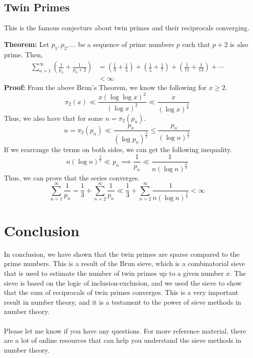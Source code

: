 \subsection{Twin Primes}
This is the famous conjecture about twin primes and their reciprocals converging.
\begin{boxedsection}
    \textbf{Theorem:} Let $p_1, p_2, \dots$ be a sequence of prime numbers $p$ such that $p+2$ is also prime. Then,
    \begin{align*}
        \sum_{n=1}^\infty \left(\frac{1}{p_n} + \frac{1}{p_n+2}\right) &= \left(\frac{1}{3} + \frac{1}{5}\right) + \left(\frac{1}{5} + \frac{1}{7}\right) + \left(\frac{1}{11} + \frac{1}{13}\right) + \cdots\\
        &< \infty
    \end{align*}
    \textbf{Proof:} From the above Brun's Theorem, we know the following for $x \geq 2$.
    $$
    \pi_2(x) \ll \frac{x (\log \log x)^2}{(\log x)^2} \ll \frac{x}{(\log x)^{\frac{3}{2}}}
    $$
    Thus, we also have that for some $n = \pi_2(p_n)$.
    $$
    n = \pi_2(p_n) \ll \frac{p_n}{(\log p_n)^{\frac{3}{2}}} \leq \frac{p_n}{(\log n)^\frac{3}{2}}
    $$
    If we rearrange the terms on both sides, we can get the following inequality.
    $$
    n (\log n)^{\frac{3}{2}} \ll p_n \implies \frac{1}{p_n} \ll \frac{1}{n (\log n)^{\frac{3}{2}}}
    $$
    Thus, we can prove that the series converges.
    $$
    \sum_{n=1}^\infty \frac{1}{p_n} = \frac{1}{3} + \sum_{n=2}^\infty \frac{1}{p_n} \ll \frac{1}{3} + \sum_{n=2}^\infty \frac{1}{n (\log n)^{\frac{3}{2}}} < \infty
    $$
\end{boxedsection}
\section{Conclusion}
In conclusion, we have shown that the twin primes are sparse compared to the prime numbers. This is a result of the Brun sieve, which is a combinatorial sieve that is used to estimate the number of twin primes up to a given number $x$. The sieve is based on the logic of inclusion-exclusion, and we used the sieve to show that the sum of reciprocals of twin primes converges. This is a very important result in number theory, and it is a testament to the power of sieve methods in number theory.\\
\\
Please let me know if you have any questions. For more reference material, there are a lot of online resources that can help you understand the sieve methods in number theory. 

